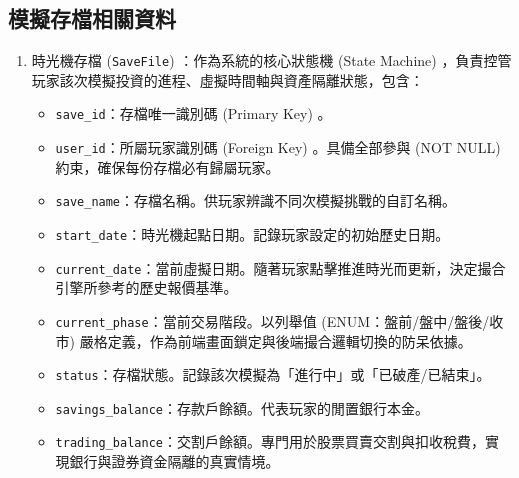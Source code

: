\documentclass[UTF8, a4paper, 12pt, fontset=none]{ctexart}
\begin{document}
    \subsection{模擬存檔相關資料}
    \begin{enumerate}
        \item 時光機存檔 (\texttt{SaveFile}) ：作為系統的核心狀態機 (State Machine) ，負責控管玩家該次模擬投資的進程、虛擬時間軸與資產隔離狀態，包含：
        \begin{itemize}
            \item \texttt{save\_id}：存檔唯一識別碼 (Primary Key) 。
            \item \texttt{user\_id}：所屬玩家識別碼 (Foreign Key) 。具備全部參與 (NOT NULL) 約束，確保每份存檔必有歸屬玩家。
            \item \texttt{save\_name}：存檔名稱。供玩家辨識不同次模擬挑戰的自訂名稱。
            \item \texttt{start\_date}：時光機起點日期。記錄玩家設定的初始歷史日期。
            \item \texttt{current\_date}：當前虛擬日期。隨著玩家點擊推進時光而更新，決定撮合引擎所參考的歷史報價基準。
            \item \texttt{current\_phase}：當前交易階段。以列舉值 (ENUM：盤前/盤中/盤後/收市) 嚴格定義，作為前端畫面鎖定與後端撮合邏輯切換的防呆依據。
            \item \texttt{status}：存檔狀態。記錄該次模擬為「進行中」或「已破產/已結束」。
            \item \texttt{savings\_balance}：存款戶餘額。代表玩家的閒置銀行本金。
            \item \texttt{trading\_balance}：交割戶餘額。專門用於股票買賣交割與扣收稅費，實現銀行與證券資金隔離的真實情境。
        \end{itemize}


\end{enumerate}
\end{document}
